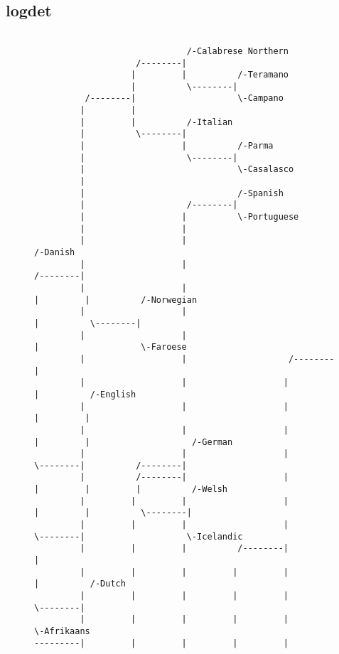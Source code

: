 \subsection{logdet}
\begin{figure}[!htb]
\begin{center}
{
\selectfont
\begin{verbatim}

                              /-Calabrese Northern
                    /--------|
                   |         |          /-Teramano
                   |          \--------|
          /--------|                    \-Campano
         |         |
         |         |          /-Italian
         |          \--------|
         |                   |          /-Parma
         |                    \--------|
         |                              \-Casalasco
         |
         |                              /-Spanish
         |                    /--------|
         |                   |          \-Portuguese
         |                   |
         |                   |                                        /-Danish
         |                   |                              /--------|
         |                   |                             |         |          /-Norwegian
         |                   |                             |          \--------|
         |                   |                             |                    \-Faroese
         |                   |                    /--------|
         |                   |                   |         |          /-English
         |                   |                   |         |         |
         |                   |                   |         |         |                    /-German
         |                   |                   |          \--------|          /--------|
         |          /--------|                   |                   |         |         |          /-Welsh
         |         |         |                   |                   |         |          \--------|
         |         |         |                   |                    \--------|                    \-Icelandic
         |         |         |          /--------|                             |
         |         |         |         |         |                             |          /-Dutch
         |         |         |         |         |                              \--------|
         |         |         |         |         |                                        \-Afrikaans
---------|         |         |         |         |

\end{verbatim}}
\end{center}
\end{figure}
